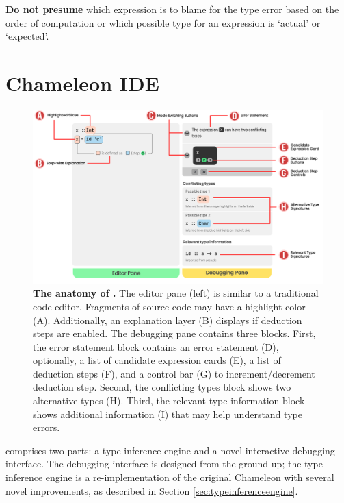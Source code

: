 \noindent\textbf{Do not presume} which expression is to blame for the type error based on the order of computation or which possible type for an expression is `actual' or `expected'.


\section{Chameleon IDE} \label{chameleon}
\begin{figure}
    \centering
    \includegraphics[width=\textwidth, trim=0mm 10mm 0mm 0mm]{images/atonomy.pdf}
    \caption{
        \textbf{The anatomy of \chameleon{}.}
        The editor pane (left) is similar to a traditional code editor. Fragments of source code may have a highlight
        color (A). Additionally, an explanation layer (B) displays if deduction steps are enabled. The debugging pane contains three blocks. First, the error statement block contains an error statement (D), optionally, a list of candidate expression cards (E), a list of deduction steps (F), and a control bar (G) to increment/decrement deduction step. Second, the conflicting types block shows two alternative types (H). Third, the relevant type information block shows additional information (I) that may help understand type errors.
    }
    \label{fig:anatomy}
\end{figure}


\chameleon{} comprises two parts: a type inference engine and a novel interactive debugging interface. 
The debugging interface is designed from the ground up; the type inference engine is a re-implementation of the original Chameleon with several novel improvements, as described in Section \ref{sec:typeinferenceengine}.

